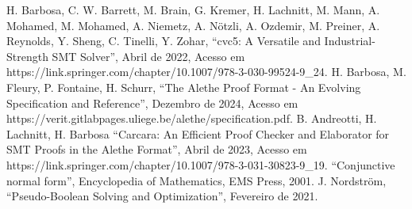 \documentclass[conference]{IEEEtran}
\begin{document}
\begin{thebibliography}{00}
              H. Barbosa, C. W. Barrett, M. Brain, G. Kremer, H. Lachnitt, M. Mann, A. Mohamed, M. Mohamed, A. Niemetz, A. Nötzli, A. Ozdemir, M. Preiner, A. Reynolds, Y. Sheng, C. Tinelli, Y. Zohar, ``cvc5: A Versatile and Industrial-Strength SMT Solver'', Abril de 2022, Acesso em https://link.springer.com/chapter/10.1007/978-3-030-99524-9\_24.
            H. Barbosa, M. Fleury, P. Fontaine, H. Schurr, ``The Alethe Proof Format - An Evolving Specification and Reference'', Dezembro de 2024, Acesso em https://verit.gitlabpages.uliege.be/alethe/specification.pdf.
           B. Andreotti, H. Lachnitt, H. Barbosa ``Carcara: An Efficient Proof Checker and Elaborator for SMT Proofs in the Alethe Format'', Abril de 2023, Acesso em https://link.springer.com/chapter/10.1007/978-3-031-30823-9\_19.
               ``Conjunctive normal form'', Encyclopedia of Mathematics, EMS Press, 2001.
           J. Nordström, ``Pseudo-Boolean Solving and Optimization'', Fevereiro de 2021.
\end{thebibliography}
\end{document}
